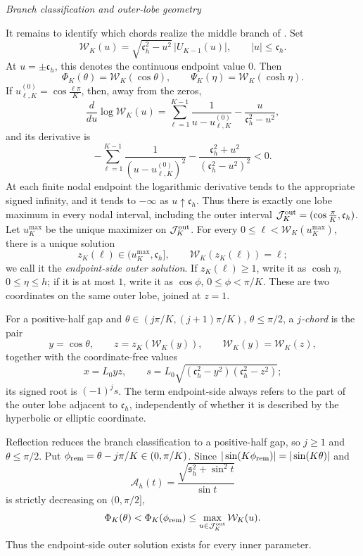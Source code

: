 \documentclass[a4paper,preprint,12pt,nopreprintline,sort&compress]{elsarticle}
\numberwithin{equation}{section}
\theoremstyle{remark}
\newcommand{\proofstage}[1]{%
  \par\medskip\noindent\textit{#1}\par\nobreak\smallskip}
\begin{document}
\proofstage{Branch classification and outer-lobe geometry}
It remains to identify which chords realize the middle branch of
.  Set
\begin{equation}\label{eq:Wcal-def}
 \mathcal W_K(u)=\sqrt{\mathfrak c_h^2-u^2}\,|U_{K-1}(u)|,
 \qquad |u|\leq\mathfrak c_h.
\end{equation}
At \(u=\pm\mathfrak c_h\), this denotes the continuous endpoint value
\(0\).
Then
\[
 \Phi_K(\theta)=\mathcal W_K(\cos\theta),\qquad
 \Psi_K(\eta)=\mathcal W_K(\cosh\eta).
\]
If \(u_{\ell,K}^{(0)}=\cos\frac{\ell\pi}{K}\), then, away from the zeros,
\[
 \frac{d}{du}\log\mathcal W_K(u)
 =\sum_{\ell=1}^{K-1}\frac1{u-u_{\ell,K}^{(0)}}
 -\frac{u}{\mathfrak c_h^2-u^2},
\]
and its derivative is
\begin{equation}\label{eq:W-log-concave}
 -\sum_{\ell=1}^{K-1}\frac1{(u-u_{\ell,K}^{(0)})^2}
 -\frac{\mathfrak c_h^2+u^2}{(\mathfrak c_h^2-u^2)^2}<0.
\end{equation}
At each finite nodal endpoint the logarithmic derivative tends to the
appropriate signed infinity, and it tends to \(-\infty\) as
\(u\uparrow\mathfrak c_h\).  Thus there is exactly one lobe maximum in
every nodal
interval, including the outer interval
\(\mathcal J_K^{\rm out}=(\cos\frac{\pi}{K},\mathfrak c_h)\).  Let
\(u_K^{\max}\) be the unique maximizer on \(\mathcal J_K^{\rm out}\).
For every
\(0\leq\ell<\mathcal W_K(u_K^{\max})\), there is a unique solution
\[
 z_K(\ell)\in(u_K^{\max},\mathfrak c_h],\qquad
 \mathcal W_K(z_K(\ell))=\ell;
\]
we call it the \emph{endpoint-side outer solution}.  If
\(z_K(\ell)\geq1\), write it as \(\cosh\eta\),
\(0\leq\eta\leq h\); if it is at most \(1\), write it as
\(\cos\phi\), \(0\leq\phi<\pi/K\).  These are two coordinates on the
same outer lobe, joined at \(z=1\).

For a positive-half gap and
\(\theta\in(j\pi/K,(j+1)\pi/K)\), \(\theta\leq\pi/2\), a
\emph{$j$-chord} is the pair
\[
 y=\cos\theta,\qquad
 z=z_K(\mathcal W_K(y)),\qquad
 \mathcal W_K(y)=\mathcal W_K(z),
\]
together with the coordinate-free values
\[
 x=L_0yz,\qquad
 s=L_0\sqrt{(\mathfrak c_h^2-y^2)(\mathfrak c_h^2-z^2)};
\]
its signed root is
\((-1)^j s\).  The term endpoint-side always refers to the part of the
outer lobe adjacent to \(\mathfrak c_h\), independently of whether it is
described by the hyperbolic or elliptic coordinate.

Reflection reduces the branch classification to a positive-half gap, so
\(j\geq1\)
and \(\theta\leq\pi/2\).  Put
\(\phi_{\rm rem}=\theta-j\pi/K\in(0,\pi/K)\).  Since
\(|\sin(K\phi_{\rm rem})|=|\sin(K\theta)|\) and
\[
 \mathcal A_h(t)=
 \frac{\sqrt{\mathfrak s_h^2+\sin^2t}}{\sin t}
\]
is strictly decreasing on \((0,\pi/2]\),
\begin{equation}\label{eq:outer-level-dominates}
 \Phi_K(\theta)<\Phi_K(\phi_{\rm rem})
 \leq\max_{u\in\mathcal J_K^{\rm out}}\mathcal W_K(u).
\end{equation}
Thus the endpoint-side outer solution exists for every inner parameter.
\end{document}
